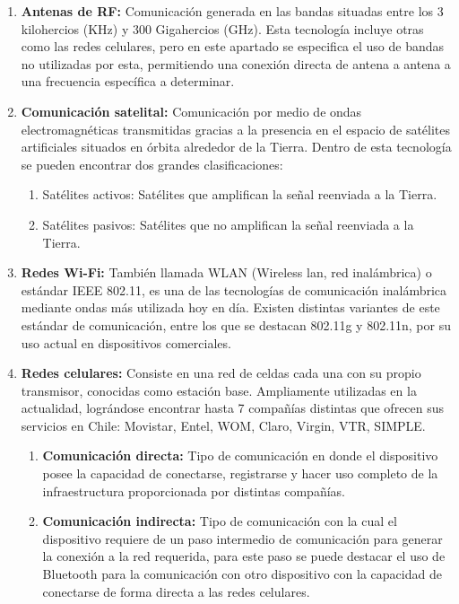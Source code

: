 \begin{enumerate}
	\item \textbf{Antenas de RF:}\cite{RF}
	Comunicación generada en las bandas situadas entre los 3 kilohercios (KHz) y 300 Gigahercios (GHz). Esta tecnología incluye otras como las redes celulares, pero en este apartado se especifica el uso de bandas no utilizadas por esta, permitiendo una conexión directa de antena a antena a una frecuencia específica a determinar.
	
	\item \textbf{Comunicación satelital:}\cite{satelite}
	Comunicación  por medio de ondas electromagnéticas transmitidas gracias a la presencia en el espacio de satélites artificiales situados en órbita alrededor de la Tierra. Dentro de esta tecnología se pueden encontrar dos grandes clasificaciones: 
	\begin{enumerate}
		\item Satélites activos: Satélites que amplifican la señal reenviada a la Tierra.
		\item Satélites pasivos: Satélites que no amplifican la señal reenviada a la Tierra.
	\end{enumerate}
	
	\item \textbf{Redes Wi-Fi:}\cite{wifi}
	También llamada WLAN (Wireless lan, red inalámbrica) o estándar IEEE 802.11, es una de las tecnologías de comunicación inalámbrica mediante ondas más utilizada hoy en día. Existen distintas variantes de este estándar de comunicación, entre los que se destacan 802.11g y 802.11n, por su uso actual en dispositivos comerciales.
	
	\item \textbf{Redes celulares:}\cite{celular}
	Consiste en una red de celdas cada una con su propio transmisor, conocidas como estación base. Ampliamente utilizadas en la actualidad, lográndose encontrar hasta 7 compañías distintas que ofrecen sus servicios en Chile: Movistar, Entel, WOM, Claro, Virgin, VTR, SIMPLE.
	\begin{enumerate}
		\item \textbf{Comunicación directa:}
		Tipo de comunicación en donde el dispositivo posee la capacidad de conectarse, registrarse y hacer uso completo de la infraestructura proporcionada por distintas compañías.
		
		\item \textbf{Comunicación indirecta:}
		Tipo de comunicación con la cual el dispositivo requiere de un paso intermedio de comunicación para generar la conexión a la red requerida, para este paso se puede destacar el uso de Bluetooth para la comunicación con otro dispositivo con la capacidad de conectarse de forma directa a las redes celulares.
	\end{enumerate}	
\end{enumerate}	

